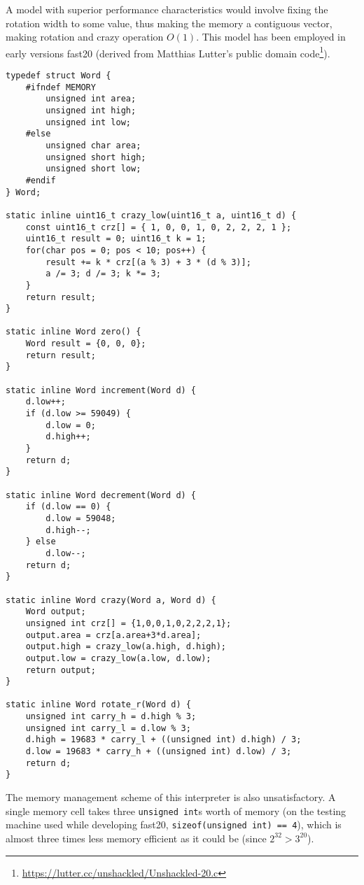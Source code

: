 \par A model with superior performance characteristics would involve fixing the rotation width to some value, thus making the memory a contiguous vector, making rotation and crazy operation $O(1)$. This model has been employed in early versions fast20 (derived from Matthias Lutter's public domain code\footnote{\url{https://lutter.cc/unshackled/Unshackled-20.c}}).

\begin{verbatim}
typedef struct Word {
    #ifndef MEMORY
        unsigned int area;
        unsigned int high;
        unsigned int low;
    #else
        unsigned char area;
        unsigned short high;
        unsigned short low;
    #endif
} Word;

static inline uint16_t crazy_low(uint16_t a, uint16_t d) {
    const uint16_t crz[] = { 1, 0, 0, 1, 0, 2, 2, 2, 1 };
    uint16_t result = 0; uint16_t k = 1;
    for(char pos = 0; pos < 10; pos++) {
        result += k * crz[(a % 3) + 3 * (d % 3)];
        a /= 3; d /= 3; k *= 3;
    }
    return result;
}

static inline Word zero() {
    Word result = {0, 0, 0};
    return result;
}

static inline Word increment(Word d) {
    d.low++;
    if (d.low >= 59049) {
        d.low = 0;
        d.high++;
    }
    return d;
}

static inline Word decrement(Word d) {
    if (d.low == 0) {
        d.low = 59048;
        d.high--;
    } else
        d.low--;
    return d;
}

static inline Word crazy(Word a, Word d) {
    Word output;
    unsigned int crz[] = {1,0,0,1,0,2,2,2,1};
    output.area = crz[a.area+3*d.area];
    output.high = crazy_low(a.high, d.high);
    output.low = crazy_low(a.low, d.low);
    return output;
}

static inline Word rotate_r(Word d) {
    unsigned int carry_h = d.high % 3;
    unsigned int carry_l = d.low % 3;
    d.high = 19683 * carry_l + ((unsigned int) d.high) / 3;
    d.low = 19683 * carry_h + ((unsigned int) d.low) / 3;
    return d;
}
\end{verbatim}

\par The memory management scheme of this interpreter is also unsatisfactory. A single memory cell takes three \verb|unsigned int|s worth of memory (on the testing machine used while developing fast20, \verb|sizeof(unsigned int) == 4|), which is almost three times less memory efficient as it could be (since $2^{32} > 3^{20}$).

